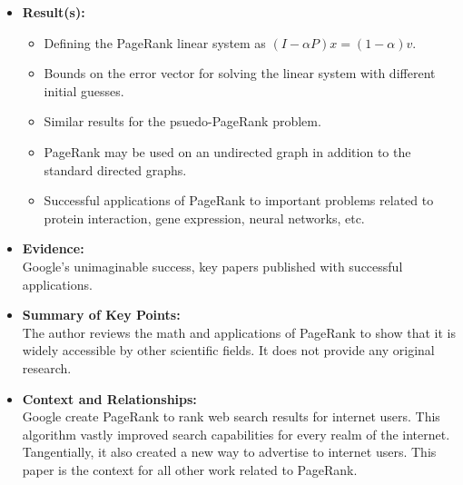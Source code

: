 \documentclass{article}
\begin{document}
\begin{itemize}
\item{\textbf{Result(s):}}
\\
\begin{itemize}
\item
Defining the PageRank linear system as $(I-\alpha P)x = (1-\alpha)v$.
\item
Bounds on the error vector for solving the linear system with different initial guesses.
\item
Similar results for the psuedo-PageRank problem.
\item
PageRank may be used on an undirected graph in addition to the standard directed graphs.
\item
Successful applications of PageRank to important problems related to protein interaction, gene expression, neural networks, etc.
\end{itemize}
\item{\textbf{Evidence:}}
\\
Google's unimaginable success, key papers published with successful applications.
\item{\textbf{Summary of Key Points:}}
\\
The author reviews the math and applications of PageRank to show that it is widely accessible by other scientific fields. It does not provide any original research.
\item{\textbf{Context and Relationships:}}
\\
Google create PageRank to rank web search results for internet users. This algorithm vastly improved search capabilities for every realm of the internet. Tangentially, it also created a new way to advertise to internet users. This paper is the context for all other work related to PageRank. 


\end{itemize}
\end{document}
